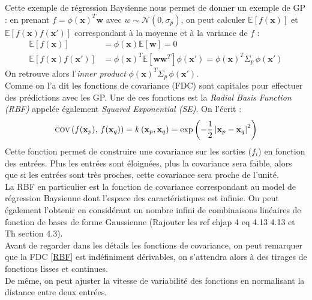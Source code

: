\documentclass[a4paper,12pt]{report}
\newcommand{\bepar}[1]{
	\left( #1 \right)  
}
\numberwithin{equation}{section} %
\begin{document}
\noindent Cette exemple de régression Baysienne nous permet de donner un exemple de GP : en prenant $f = \phi(\textbf{x})^T\textbf{w}$ avec $w \sim \mathcal{N}\bepar{0, \sigma_p}$, on peut calculer $\mathbb{E}[f(\textbf{x})]$ et $\mathbb{E}[f(\textbf{x})f(\textbf{x}')]$ correspondant à la moyenne et à la variance de $f$ :
\begin{align*}
\mathbb{E}[f(\textbf{x})] & = \phi(\textbf{x})\mathbb{E}[\textbf{w}] = 0 \\
\mathbb{E}[f(\textbf{x})f(\textbf{x}')] & = \phi(\textbf{x})^T \mathbb{E}[\textbf{w}\textbf{w}^T]\phi(\textbf{x}') = \phi(\textbf{x})^T \Sigma_p \, \phi(\textbf{x}')
\end{align*}
On retrouve alors l'\textit{inner product} $\phi(\textbf{x})^T \Sigma_p \, \phi(\textbf{x}')$.\\
Comme on l'a dit les fonctions de covariance (FDC) sont capitales pour effectuer des prédictions avec les GP. Une de ces fonctions est la \textit{Radial Basis Function (RBF)} appelée également \textit{Squared Exponential (SE)}. On l'écrit :
\begin{equation}
 \textsc{cov}\bepar{f(\textbf{x}_p), \, f(\mathbf{x}_q)} = k\bepar{\textbf{x}_p, \textbf{x}_q} = \exp{\bepar{-\frac{1}{2}\left| \textbf{x}_p  - \textbf{x}_q\right|^2}}\label{RBF}
 \end{equation} 
Cette fonction permet de construire une covariance sur les sorties ($f_i$) en fonction des entrées. Plus les entrées sont éloignées, plus la covariance sera faible, alors que si les entrées sont très proches, cette covariance sera proche de l'unité.\\
La RBF en particulier est la fonction de covariance correspondant au model de régression Baysienne dont l'espace des caractéristiques est infinie. On peut également l'obtenir en considérant un nombre infini de combinaisons linéaires de fonction de bases de forme Gaussienne (Rajouter les ref chjap 4 eq 4.13 4.13 et Th section 4.3).\\
Avant de regarder dans les détails les fonctions de covariance, on peut remarquer que la FDC \eqref{RBF} est indéfiniment dérivables, on s'attendra alors à des tirages de fonctions lisses et continues.\\
De même, on peut ajuster la vitesse de variabilité des fonctions en normalisant la distance entre deux entrées.
\end{document}

